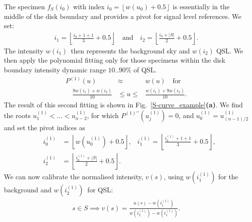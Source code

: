 \documentclass{aa}
\newcommand{\eqnl}[2]{\begin{eqnarray}\label{#1}#2\end{eqnarray}}
\newcommand{\floor}[1]{\left\lfloor #1 \right\rfloor}
\begin{document}
  The specimen $f_S(i_0)$ with index $i_0 = \floor{w(u_0)+0.5}$ is essentially
  in the middle of the disk boundary and provides a pivot for signal level
  references.
  We set:
  \eqnl{scurve-pivots}{
  i_1 = \floor{\frac{i_0 + 1 + 1}{3} + 0.5} \quad \text{and} \quad
  i_2 = \floor{\frac{i_0 + |S|}{2} + 0.5} \text{.}
  }
  The intensity $w(i_1)$ then represents the background sky and $w(i_2)$ QSL.
  We then apply the polynomial fitting only for those specimens within the
  disk boundary intensity dynamic range $10 .. 90 \%$ of QSL.
  \eqnl{scurve-approx1}{
  P^{(1)}(u) &\approx& w(u) \quad \text{for}\\ \quad \frac{9 w(i_1) + w(i_2)}{10} &\le u \le& \frac{w(i_1) + 9 w(i_2)}{10} \text{.} \nonumber
  }
  The result of this second fitting is shown in
  Fig.~\ref{S-curve_example}{\bf(a)}. 
  We find the roots $u_1^{(1)}< ... < u_{n-2}^{(1)}$, for which
  $P^{(1)\prime\prime}(u_j^{(1)}) = 0$, and $u_0^{(1)} = u_{{(n-1)}/{2}}^{(1)}$ 
  and set the pivot indices 
  as
  \eqnl{scurve-pivots1}{
  &i_0^{(1)}& = \floor{w(u_0^{(1)})+0.5}
  \text{,}
  \quad i_1^{(1)} = \floor{\frac{i_0^{(1)} + 1 + 1}{3} + 0.5} 
  \text{,} 
  \nonumber \\
  &i_2^{(1)}& = \floor{\frac{i_0^{(1)} + |S|}{2} + 0.5} \text{.}
  }
  We can now calibrate the normalised intensity, $v(s)$,
  using $w(i_1^{(1)})$ for the background and $w(i_2^{(1)})$ for QSL:
  \eqnl{scurve-calibration}{
  s \in S \implies v(s) = \frac{u(s) - w(i_1^{(1)})}{w(i_2^{(1)}) - w(i_1^{(1)})} \text{.}
  }
\end{document}
